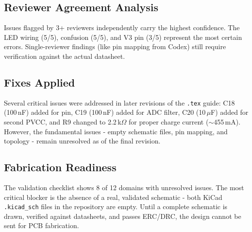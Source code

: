 \subsection{Reviewer Agreement Analysis}

\begin{calloutnote}
Issues flagged by 3+ reviewers independently carry the highest confidence.  The
 LED wiring (5/5),  confusion (5/5), and 
V3 pin (3/5) represent the most certain errors.  Single-reviewer findings (like
 pin mapping from Codex) still require verification against the
actual datasheet.
\end{calloutnote}

\subsection{Fixes Applied}

Several critical issues were addressed in later revisions of the \texttt{.tex}
guide: C18 (100\,nF) added for   pin, C19 (100\,nF) added
for ADC filter, C20 (10\,$\mu$F) added for  second PVCC, and R9
changed to 2.2\,k$\Omega$ for proper charge current ($\sim$455\,mA).  However,
the fundamental issues - empty schematic files,  pin mapping, and
 topology - remain unresolved as of the final revision.

\subsection{Fabrication Readiness}

\begin{calloutfail}
The validation checklist shows 8 of 12 domains with unresolved issues.  The
most critical blocker is the absence of a real, validated schematic - both
KiCad \texttt{.kicad\_sch} files in the repository are empty.  Until a complete
schematic is drawn, verified against datasheets, and passes ERC/DRC, the design
cannot be sent for PCB fabrication.
\end{calloutfail}
